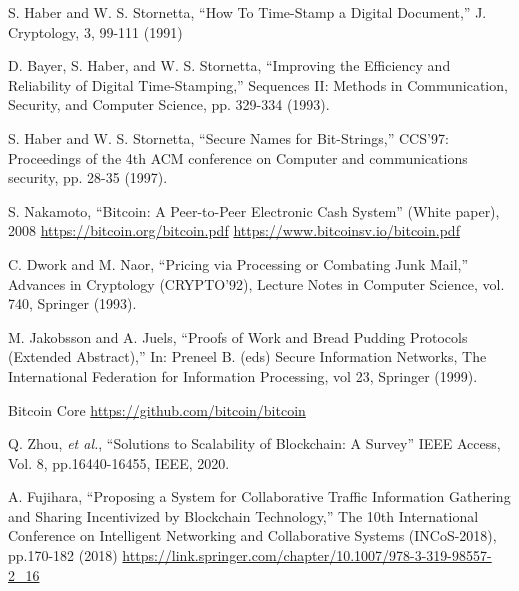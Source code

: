 \documentclass[graybox]{svmult}
\begin{document}
\begin{thebibliography}{99}

  S. Haber and W. S. Stornetta, 
  ``How To Time-Stamp a Digital Document,''
  J. Cryptology, 3, 99-111 (1991)

  D. Bayer, S. Haber, and W. S. Stornetta,
  ``Improving the Efficiency and Reliability of Digital Time-Stamping,''
  Sequences II: Methods in Communication, Security, and Computer Science, 
  pp. 329-334 (1993).

  S. Haber and W. S. Stornetta, 
  ``Secure Names for Bit-Strings,''
  CCS'97: Proceedings of the 4th ACM conference on Computer and 
  communications security, pp. 28-35 (1997).


  S. Nakamoto, 
  ``Bitcoin: A Peer-to-Peer Electronic Cash System''
  (White paper), 2008 
  \url{https://bitcoin.org/bitcoin.pdf}
  \url{https://www.bitcoinsv.io/bitcoin.pdf}


  C. Dwork and M. Naor, 
  ``Pricing via Processing or Combating Junk Mail,''
  Advances in Cryptology (CRYPTO'92), 
  Lecture Notes in Computer Science, vol. 740, Springer (1993). 


  M. Jakobsson and A. Juels, 
  ``Proofs of Work and Bread Pudding Protocols (Extended Abstract),''
  In: Preneel B. (eds) Secure Information Networks, 
  The International Federation for Information Processing, 
  vol 23, Springer (1999).


  Bitcoin Core 
  \url{https://github.com/bitcoin/bitcoin}


  Q. Zhou, \textit{et al.}, 
  ``Solutions to Scalability of Blockchain: A Survey''
  IEEE Access, Vol. 8, pp.16440-16455, IEEE, 2020. 


  A. Fujihara,
  ``Proposing a System for Collaborative Traffic Information Gathering and 
  Sharing Incentivized by Blockchain Technology,''
  The 10th International Conference on Intelligent Networking and 
  Collaborative Systems (INCoS-2018), pp.170-182 (2018)
  \url{https://link.springer.com/chapter/10.1007/978-3-319-98557-2_16}


\end{thebibliography}
\end{document}

